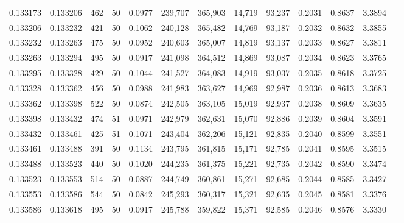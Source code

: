 \begin{tabular}{rrrrrrrrrrrrr}
0.133173 & 0.133206 &   462 &  50 &                                     0.0977 & 239,707 & 365,903 &  14,719 &  93,237 & 0.2031 & 0.8637 & 3.3894 \\
0.133206 & 0.133232 &   421 &  50 &                                     0.1062 & 240,128 & 365,482 &  14,769 &  93,187 & 0.2032 & 0.8632 & 3.3855 \\
0.133232 & 0.133263 &   475 &  50 &                                     0.0952 & 240,603 & 365,007 &  14,819 &  93,137 & 0.2033 & 0.8627 & 3.3811 \\
0.133263 & 0.133294 &   495 &  50 &                                     0.0917 & 241,098 & 364,512 &  14,869 &  93,087 & 0.2034 & 0.8623 & 3.3765 \\
0.133295 & 0.133328 &   429 &  50 &                                     0.1044 & 241,527 & 364,083 &  14,919 &  93,037 & 0.2035 & 0.8618 & 3.3725 \\
0.133328 & 0.133362 &   456 &  50 &                                     0.0988 & 241,983 & 363,627 &  14,969 &  92,987 & 0.2036 & 0.8613 & 3.3683 \\
0.133362 & 0.133398 &   522 &  50 &                                     0.0874 & 242,505 & 363,105 &  15,019 &  92,937 & 0.2038 & 0.8609 & 3.3635 \\
0.133398 & 0.133432 &   474 &  51 &                                     0.0971 & 242,979 & 362,631 &  15,070 &  92,886 & 0.2039 & 0.8604 & 3.3591 \\
0.133432 & 0.133461 &   425 &  51 &                                     0.1071 & 243,404 & 362,206 &  15,121 &  92,835 & 0.2040 & 0.8599 & 3.3551 \\
0.133461 & 0.133488 &   391 &  50 &                                     0.1134 & 243,795 & 361,815 &  15,171 &  92,785 & 0.2041 & 0.8595 & 3.3515 \\
0.133488 & 0.133523 &   440 &  50 &                                     0.1020 & 244,235 & 361,375 &  15,221 &  92,735 & 0.2042 & 0.8590 & 3.3474 \\
0.133523 & 0.133553 &   514 &  50 &                                     0.0887 & 244,749 & 360,861 &  15,271 &  92,685 & 0.2044 & 0.8585 & 3.3427 \\
0.133553 & 0.133586 &   544 &  50 &                                     0.0842 & 245,293 & 360,317 &  15,321 &  92,635 & 0.2045 & 0.8581 & 3.3376 \\
0.133586 & 0.133618 &   495 &  50 &                                     0.0917 & 245,788 & 359,822 &  15,371 &  92,585 & 0.2046 & 0.8576 & 3.3330 \\

\end{tabular}

